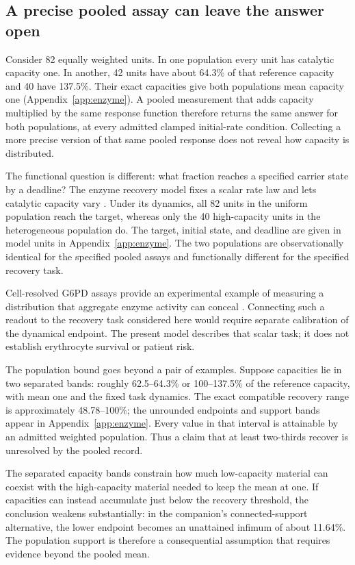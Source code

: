 \documentclass[11pt]{article}
\begin{document}
\subsection{A precise pooled assay can leave the answer open}
Consider 82 equally weighted units. In one population every unit has catalytic capacity one. In another, 42 units have about 64.3\% of that reference capacity and 40 have 137.5\%. Their exact capacities give both populations mean capacity one (Appendix~\ref{app:enzyme}). A pooled measurement that adds capacity multiplied by the same response function therefore returns the same answer for both populations, at every admitted clamped initial-rate condition. Collecting a more precise version of that same pooled response does not reveal how capacity is distributed.

The functional question is different: what fraction reaches a specified carrier state by a deadline? The enzyme recovery model fixes a scalar rate law and lets catalytic capacity vary \citep{E}. Under its dynamics, all 82 units in the uniform population reach the target, whereas only the 40 high-capacity units in the heterogeneous population do. The target, initial state, and deadline are given in model units in Appendix~\ref{app:enzyme}. The two populations are observationally identical for the specified pooled assays and functionally different for the specified recovery task.

Cell-resolved G6PD assays provide an experimental example of measuring a distribution that aggregate enzyme activity can conceal \citep{shah}. Connecting such a readout to the recovery task considered here would require separate calibration of the dynamical endpoint. The present model describes that scalar task; it does not establish erythrocyte survival or patient risk.

The population bound goes beyond a pair of examples. Suppose capacities lie in two separated bands: roughly 62.5--64.3\% or 100--137.5\% of the reference capacity, with mean one and the fixed task dynamics. The exact compatible recovery range is approximately 48.78--100\%; the unrounded endpoints and support bands appear in Appendix~\ref{app:enzyme}. Every value in that interval is attainable by an admitted weighted population. Thus a claim that at least two-thirds recover is unresolved by the pooled record.

The separated capacity bands constrain how much low-capacity material can coexist with the high-capacity material needed to keep the mean at one. If capacities can instead accumulate just below the recovery threshold, the conclusion weakens substantially: in the companion's connected-support alternative, the lower endpoint becomes an unattained infimum of about 11.64\%. The population support is therefore a consequential assumption that requires evidence beyond the pooled mean.
\end{document}
